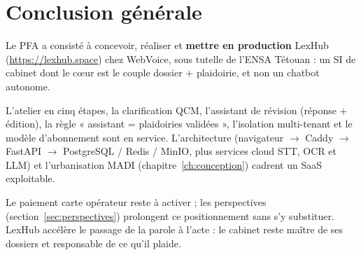 \chapter{Conclusion générale}
\label{ch:conclusion}

Le PFA a consisté à concevoir, réaliser et \textbf{mettre en production} LexHub (\url{https://lexhub.space}) chez WebVoice, sous tutelle de l'ENSA Tétouan : un SI de cabinet dont le cœur est le couple dossier + plaidoirie, et non un chatbot autonome.

L'atelier en cinq étapes, la clarification QCM, l'assistant de révision (réponse + édition), la règle « assistant = plaidoiries validées », l'isolation multi-tenant et le modèle d'abonnement sont en service. L'architecture (navigateur $\rightarrow$ Caddy $\rightarrow$ FastAPI $\rightarrow$ PostgreSQL / Redis / MinIO, plus services cloud STT, OCR et LLM) et l'urbanisation MADI (chapitre~\ref{ch:conception}) cadrent un SaaS exploitable.

Le paiement carte opérateur reste à activer ; les perspectives (section~\ref{sec:perspectives}) prolongent ce positionnement sans s'y substituer. LexHub accélère le passage de la parole à l'acte : le cabinet reste maître de ses dossiers et responsable de ce qu'il plaide.
